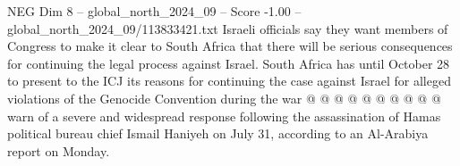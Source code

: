 \begin{textsample}{NEG Dim 8 – global\_north\_2024\_09 – Score -1.00 – global\_north\_2024\_09/113833421.txt}
Israeli officials say they want members of Congress to make it clear to South Africa that there will be serious consequences for continuing the legal process against Israel.
South Africa has until October 28 to present to the ICJ its reasons for continuing the case against Israel for alleged violations of the Genocide Convention during the war @ @ @ @ @ @ @ @ @ @ warn of a severe and widespread response following the assassination of Hamas political bureau chief Ismail Haniyeh on July 31, according to an Al-Arabiya report on Monday.

\end{textsample}
